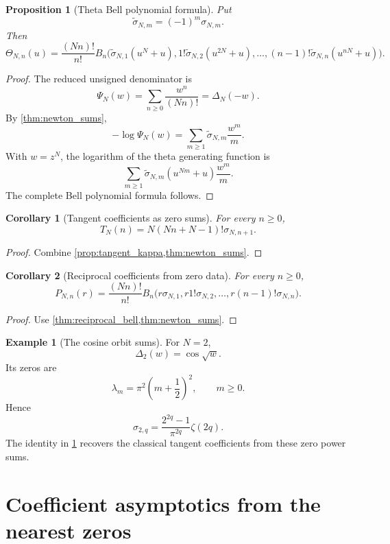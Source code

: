 \documentclass[11pt]{article}
\newtheorem{proposition}[proposition]{Proposition}
\newtheorem{corollary}[corollary]{Corollary}
\theoremstyle{definition}
\newtheorem{example}[example]{Example}
\theoremstyle{remark}
\newcommand{\Thetafun}{\mathsf\Theta}
\begin{document}
\begin{proposition}[Theta Bell polynomial formula]\label{prop:theta_bell}
Put
\[
\widetilde{\sigma}_{N,m}=(-1)^m\sigma_{N,m}.
\]
Then
\[
\Thetafun_{N,n}(u)
=
\frac{(Nn)!}{n!}
B_n\bigl(
 \widetilde{\sigma}_{N,1}(u^N+u),
 1!\widetilde{\sigma}_{N,2}(u^{2N}+u),
 \ldots,
 (n-1)!\widetilde{\sigma}_{N,n}(u^{nN}+u)
\bigr).
\]
\end{proposition}

\begin{proof}
The reduced unsigned denominator is
\[
\Psi_N(w)=\sum_{n\geq0}\frac{w^n}{(Nn)!}=\Delta_N(-w).
\]
By \cref{thm:newton_sums},
\[
-\log\Psi_N(w)
=
\sum_{m\geq1}\widetilde{\sigma}_{N,m}\frac{w^m}{m}.
\]
With $w=z^N$, the logarithm of the theta generating function is
\[
\sum_{m\geq1}
\widetilde{\sigma}_{N,m}(u^{Nm}+u)\frac{w^m}{m}.
\]
The complete Bell polynomial formula follows.
\end{proof}

\begin{corollary}[Tangent coefficients as zero sums]\label{cor:tangent_zero_sums}
For every $n\geq0$,
\[
T_N(n)
=
N(Nn+N-1)!\sigma_{N,n+1}.
\]
\end{corollary}

\begin{proof}
Combine \cref{prop:tangent_kappa,thm:newton_sums}.
\end{proof}

\begin{corollary}[Reciprocal coefficients from zero data]\label{cor:reciprocal_zero_data}
For every $n\geq0$,
\[
P_{N,n}(r)
=
\frac{(Nn)!}{n!}
B_n\bigl(
 r\sigma_{N,1},
 r1!\sigma_{N,2},
 \ldots,
 r(n-1)!\sigma_{N,n}
\bigr).
\]
\end{corollary}

\begin{proof}
Use \cref{thm:reciprocal_bell,thm:newton_sums}.
\end{proof}

\begin{example}[The cosine orbit sums]\label{ex:cosine_orbit_sums}
For $N=2$,
\[
\Delta_2(w)=\cos\sqrt w.
\]
Its zeros are
\[
\lambda_m=\pi^2\left(m+\frac12\right)^2,
\qquad m\geq0.
\]
Hence
\[
\sigma_{2,q}
=
\frac{2^{2q}-1}{\pi^{2q}}\zeta(2q).
\]
The identity in \cref{cor:tangent_zero_sums} recovers the classical tangent coefficients from these zero power sums.
\end{example}

\section{Coefficient asymptotics from the nearest zeros}\label{sec:coefficient_asymptotics}
\end{document}
